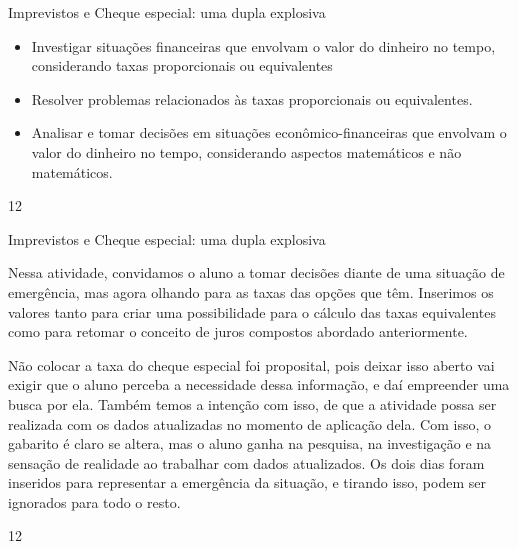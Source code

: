 \begin{objectives}{Imprevistos e Cheque especial: uma dupla explosiva}
{
\begin{itemize}
\item Investigar situações financeiras que envolvam o valor do dinheiro no tempo, considerando taxas proporcionais ou equivalentes
\item Resolver problemas relacionados às taxas proporcionais ou equivalentes.
\item Analisar e tomar decisões em situações econômico-financeiras que envolvam o valor do dinheiro no tempo, considerando aspectos matemáticos e não matemáticos.
\end{itemize}
}{1}{2}
\end{objectives}
\marginpar{\vspace{-2.5em}}
\begin{sugestions}{Imprevistos e Cheque especial: uma dupla explosiva}
{
Nessa atividade, convidamos o aluno a tomar decisões diante de uma situação de emergência, mas agora olhando para as taxas das opções que têm. Inserimos os valores tanto para criar uma possibilidade para o cálculo das taxas equivalentes como para retomar o conceito de juros compostos abordado anteriormente. 

Não colocar a taxa do cheque especial foi proposital, pois deixar isso aberto vai exigir que o aluno perceba a necessidade dessa informação, e daí empreender uma busca por ela. Também temos a intenção com isso, de que a atividade possa ser realizada com os dados atualizadas no momento de aplicação dela. Com isso, o gabarito é claro se altera, mas o aluno ganha na pesquisa, na investigação e na sensação de realidade ao trabalhar com dados atualizados. 
Os dois dias foram inseridos para representar a emergência da situação, e tirando isso, podem ser ignorados para todo o resto.

}{1}{2}
\end{sugestions}

